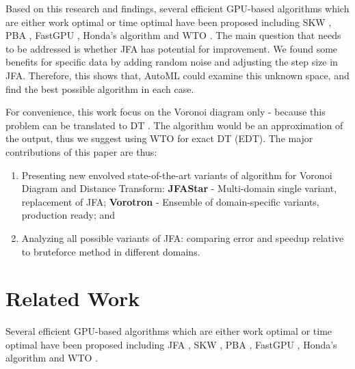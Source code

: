 \documentclass[format=acmsmall,screen,review,authordraft,nonacm]{acmart}
\newcommand{\ourjfasingle}{JFAStar}
\newcommand{\ourjfa}{Vorotron} %
\begin{document}
Based on this research and findings, several efficient GPU-based algorithms
which are either work optimal or time optimal have been proposed including SKW
\cite{schneider2009gpu}, PBA \cite{cao2010parallel}, FastGPU \cite{de2017fast},
Honda's algorithm \cite{honda2017simple} and WTO \cite{manduhu2019work}.
The main question that needs to be addressed is whether JFA has potential for
improvement. We found some benefits for specific data by adding random noise and
adjusting the step size in JFA. Therefore, this shows that, AutoML could
examine this unknown space, and find the best possible algorithm in each case.

For convenience, this work focus on the Voronoi diagram only - because this
problem can be translated to DT \cite{rong2006jump}.  The algorithm would be an
approximation of the output, thus we suggest using WTO \cite{manduhu2019work}
for exact DT (EDT). The major contributions of this paper are thus:

\begin{enumerate}
	\item Presenting new envolved state-of-the-art variants of algorithm for Voronoi
		Diagram and Distance Transform: %
		\textbf{\ourjfasingle} - Multi-domain single variant, replacement of JFA;
		\textbf{\ourjfa} - Ensemble of domain-specific variants, production ready; and
	\item Analyzing all possible variants of JFA: comparing error and speedup
		relative to bruteforce method in different domains.
\end{enumerate}

\section{Related Work} %

Several efficient GPU-based algorithms which are either work optimal or time
optimal have been proposed including JFA \cite{rong2006jump}, SKW
\cite{schneider2009gpu}, PBA \cite{cao2010parallel}, FastGPU \cite{de2017fast},
Honda's algorithm \cite{honda2017simple} and WTO \cite{manduhu2019work}.
\end{document}
